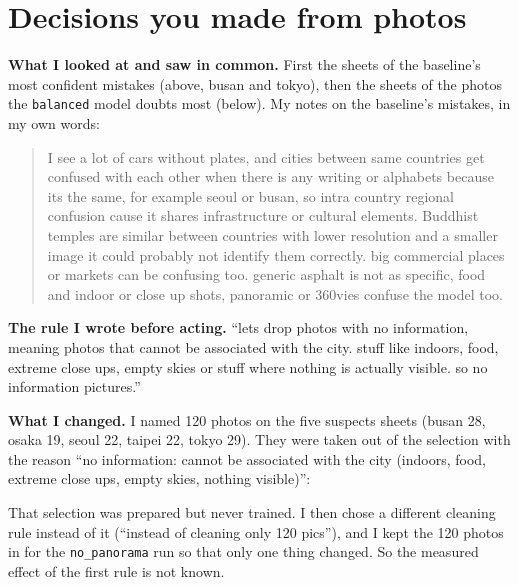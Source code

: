 \documentclass[11pt]{article}
\begin{document}

\section*{Decisions you made from photos}



\textbf{What I looked at and saw in common.} First the sheets of the
baseline's most confident mistakes (above, busan and tokyo), then the
sheets of the photos the \texttt{balanced} model doubts most (below). My notes
on the baseline's mistakes, in my own words:

\begin{quote}\small
I see a lot of cars without plates, and cities between same countries get
confused with each other when there is any writing or alphabets because its
the same, for example seoul or busan, so intra country regional confusion
cause it shares infrastructure or cultural elements. Buddhist temples are
similar between countries with lower resolution and a smaller image it could
probably not identify them correctly. big commercial places or markets can be
confusing too. generic asphalt is not as specific, food and indoor or close up
shots, panoramic or 360vies confuse the model too.
\end{quote}


\textbf{The rule I wrote before acting.} ``lets drop photos with no
information, meaning photos that cannot be associated with the city. stuff
like indoors, food, extreme close ups, empty skies or stuff where nothing is
actually visible. so no information pictures.''

\textbf{What I changed.} I named 120 photos on the five suspects sheets
(busan 28, osaka 19, seoul 22, taipei 22, tokyo 29). They were taken out of
the selection with the reason ``no information: cannot be associated with the
city (indoors, food, extreme close ups, empty skies, nothing visible)'':


That selection was prepared but never trained. I then chose a different
cleaning rule instead of it (``instead of cleaning only 120 pics''), and I
kept the 120 photos in for the \texttt{no\_panorama} run so that only one
thing changed. So the measured effect of the first rule is not known.
\end{document}
